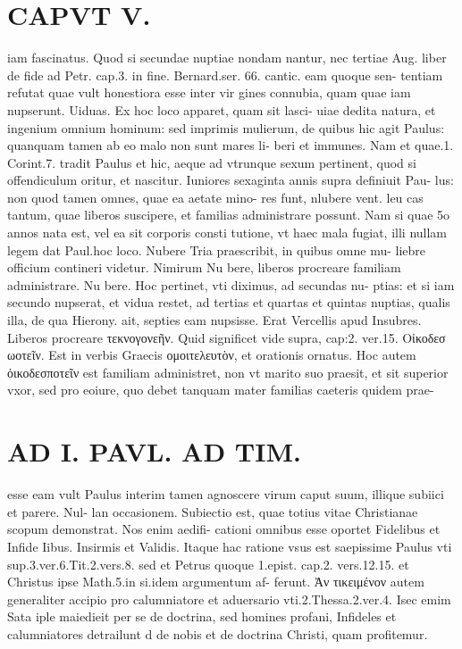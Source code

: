 \documentclass{article}
\begin{document}
\begin{pages}
\section*{CAPVT  V. }
\marginpar{[ p.299 ]}\pstart iam fascinatus. Quod si secundae nuptiae nondam nantur, nec tertiae Aug. liber  de fide ad Petr. cap.3. in fine. Bernard.ser. 66. cantic. eam quoque sen- tentiam refutat quae vult honestiora esse inter vir gines connubia, quam quae iam nupserunt.  \pend\pstart Uiduas. Ex hoc loco apparet, quam sit lasci- uiae dedita natura, et ingenium omnium hominum: sed imprimis mulierum, de quibus hic agit Paulus: quanquam tamen ab eo malo non sunt mares li- beri et immunes. Nam et quae.1. Corint.7. tradit Paulus et hic, aeque ad vtrunque sexum pertinent, quod si offendiculum oritur, et nascitur.  \pend\pstart Iuniores sexaginta annis supra definiuit Pau- lus: non quod tamen omnes, quae ea aetate mino- res funt, nlubere vent. leu cas tantum, quae liberos suscipere, et familias administrare possunt. Nam si quae 5o annos nata est, vel ea sit corporis consti tutione, vt haec mala fugiat, illi nullam legem dat Paul.hoc loco.  \pend\pstart Nubere Tria praescribit, in quibus omne mu- liebre officium contineri videtur. Nimirum Nu bere, liberos procreare familiam administrare. Nu bere. Hoc pertinet, vti diximus, ad secundas nu- ptias: et si iam secundo nupserat, et vidua restet, ad tertias et quartas et quintas nuptias, qualis illa, de qua Hierony. ait, septies eam nupsisse. Erat Vercellis apud Insubres. Liberos procreare τεκνογονεῆν. Quid significet vide supra, cap:2. ver.15. Oἰκοδεσ ωοτεῖν. Est in verbis Graecis ομοιτελευτὸν, et orationis ornatus. Hoc autem ὀικοδεσποτεῖν est familiam administret, non vt marito suo praesit, et sit superior vxor, sed pro eoiure, quo debet tanquam mater familias caeteris quidem prae-  \pend
\section*{AD I. PAVL. AD TIM. }
\marginpar{[ p.300. ]}\pstart esse eam vult Paulus interim tamen agnoscere virum caput suum, illique subiici et parere. Nul- lan occasionem. Subiectio est, quae totius vitae Christianae scopum demonstrat. Nos enim aedifi- cationi omnibus esse oportet Fidelibus et Infide Iibus. Insirmis et Validis. Itaque  hac ratione vsus est saepissime Paulus vti sup.3.ver.6.Tit.2.vers.8. sed et Petrus quoque 1.epist. cap.2. vers.12.15. et Christus ipse Math.5.in si.idem argumentum af- ferunt. Ἀν τικειμένον autem generaliter accipio pro calumniatore et aduersario vti.2.Thessa.2.ver.4. Isec emim Sata iple maiedieit per se de doctrina, sed homines profani, Infideles et calumniatores detrailunt d de nobis et de doctrina Christi, quam profitemur.  \pend
{}
{}

\end{pages}
\end{document}
